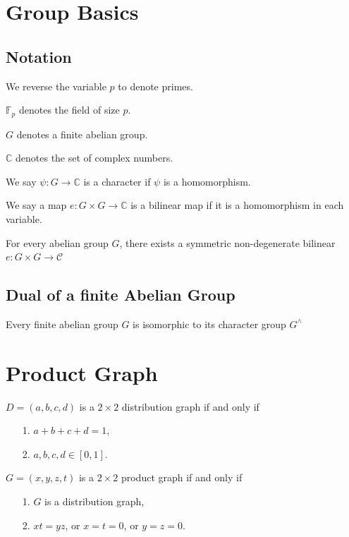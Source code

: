 \section{Group Basics}
\subsection{Notation}
We reverse the variable $p$ to denote primes.

$\mathbb{F}_p$ denotes the field of size $p$.

$G$ denotes a finite abelian group. 

$\mathbb{C}$ denotes the set of complex numbers.

\begin{definition}
We say $\psi : G \rightarrow \mathbb{C}$ is a character if $\psi$ is a homomorphism. 
\end{definition}

\begin{definition}
We say a map $e : G \times G  \rightarrow \mathbb{C}$ is a bilinear map if it is a homomorphism in each variable. 
\end{definition}
\begin{theorem}
For every abelian group $G$, there exists a symmetric non-degenerate bilinear $e : G \times G \rightarrow \mathcal{C}$ 
\end{theorem}
\subsection{Dual of a finite Abelian Group}
\begin{theorem}
Every ﬁnite abelian group $G$ is isomorphic to its character group $G^\land$
\end{theorem}

\section{Product Graph}
\begin{definition}
$D = (a,b,c,d)$ is a $2 \times 2$ distribution graph if and only if 
\begin{itemize}
\item [1.] $a+b+c+d=1$,
\item [2.] $a,b,c,d \in [0,1]$.   
\end{itemize}
\end{definition}

\begin{definition}
$G = (x,y,z,t)$ is a $2 \times 2$ product graph if and only if 
\begin{itemize}
\item [1.] $G$ is a distribution graph,
\item [2.] $xt = yz$, or $x = t = 0$, or $y =z = 0$.
\end{itemize}
\end{definition}


